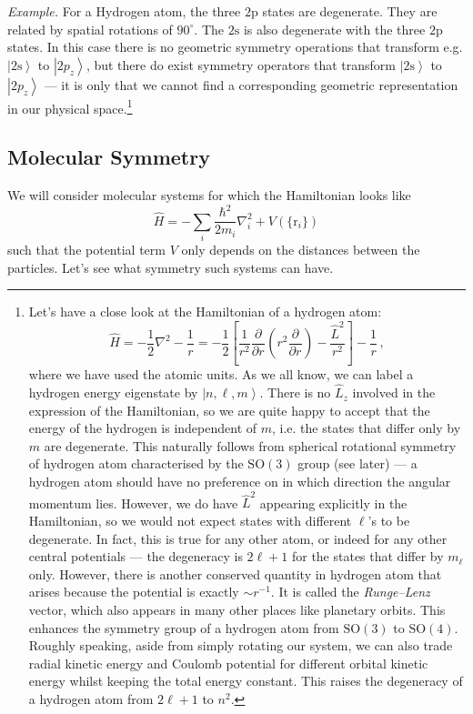 \documentclass{article}
\theoremstyle{plain}\theoremheaderfont{\normalfont\itshape}\theorembodyfont{\rmfamily}\theoremseparator{.}\newtheorem*{rem}{Remark}\newtheorem*{ex}{Example}\newtheorem*{proof}{Proof}\newtheorem*{altp}{Alternative proof}
\theoremstyle{plain}\theoremheaderfont{\normalfont\bfseries}\theorembodyfont{\rmfamily}\theoremseparator{.}\newtheorem{thm}{Theorem}[section]\newtheorem{lem}[thm]{Lemma}\newtheorem{prop}[thm]{Proposition}\newtheorem*{cor}{Corollary}\newtheorem{defn}[thm]{Definition}\newtheorem{clm}[thm]{Claim}\newtheorem{clminproof}{Claim}\newtheorem*{law}{Law}\newtheorem{pos}[thm]{Postulate}
\theoremstyle{break}\theoremheaderfont{\normalfont\itshape}\theorembodyfont{\rmfamily}\theoremseparator{.\medskip}\newtheorem*{proofskip}{Proof}\newtheorem*{exs}{Examples}\newtheorem*{rems}{Remarks}
\theoremstyle{break}\theoremheaderfont{\normalfont\bfseries}\theorembodyfont{\rmfamily}\theoremseparator{.\medskip}\newtheorem{lemskip}[thm]{Lemma}\newtheorem{defnskip}[thm]{Definition}\newtheorem{propskip}[thm]{Proposition}\newtheorem{thmskip}[thm]{Theorem}
\numberwithin{equation}{section}
\newcommand{\pdv}[3][]{\frac{\partial^{#1} #2}{{\partial #3}^{#1}}}
\newcommand{\ket}[1]{\left| #1 \right\rangle}
\newcommand{\vb}[1]{\bm{\mathrm{#1}}}
\newcommand{\laplacian}{\nabla^2}
\newcommand{\SO}{\mathrm{SO}}
\begin{document}
    \textit{Example.} For a Hydrogen atom, the three \(\mathrm{2p}\) states are degenerate. They are related by spatial rotations of \(90^\circ\). The \(\mathrm{2s}\) is also degenerate with the three \(\mathrm{2p}\) states. In this case there is no geometric symmetry operations that transform e.g. \(\ket{\mathrm{2s}}\) to \(\ket{2p_z}\), but there do exist symmetry operators that transform \(\ket{\mathrm{2s}}\) to \(\ket{2p_z}\) --- it is only that we cannot find a corresponding geometric representation in our physical space.\footnote{Let's have a close look at the Hamiltonian of a hydrogen atom:
    \begin{equation}
        \hat{H}=-\frac{1}{2}\laplacian-\frac{1}{r}=-\frac{1}{2}\left[\frac{1}{r^2}\pdv{}{r}\left(r^2\pdv{}{r}\right)-\frac{\hat{L}^2}{r^2}\right]-\frac{1}{r}\,,
    \end{equation}
    where we have used the atomic units. As we all know, we can label a hydrogen energy eigenstate by \(\ket{n,\ell,m}\). There is no \(\hat{L}_z\) involved in the expression of the Hamiltonian, so we are quite happy to accept that the energy of the hydrogen is independent of \(m\), i.e. the states that differ only by \(m\) are degenerate. This naturally follows from spherical rotational symmetry of hydrogen atom characterised by the \(\SO(3)\) group (see later) --- a hydrogen atom should have no preference on in which direction the angular momentum lies. However, we do have \(\hat{L}^2\) appearing explicitly in the Hamiltonian, so we would not expect states with different \(\ell\)'s to be degenerate. In fact, this is true for any other atom, or indeed for any other central potentials --- the degeneracy is \(2\ell+1\) for the states that differ by \(m_\ell\) only. However, there is another conserved quantity in hydrogen atom that arises because the potential is exactly \(\sim r^{-1}\). It is called the \textit{Runge--Lenz} vector, which also appears in many other places like planetary orbits. This enhances the symmetry group of a hydrogen atom from \(\SO(3)\) to \(\SO(4)\). Roughly speaking, aside from simply rotating our system, we can also trade radial kinetic energy and Coulomb potential for different orbital kinetic energy whilst keeping the total energy constant. This raises the degeneracy of a hydrogen atom from \(2\ell+1\) to \(n^2\).}

    \subsection{Molecular Symmetry}
    We will consider molecular systems for which the Hamiltonian looks like
    \begin{equation}
        \hat{H}=-\sum_{i}\frac{\hbar^2}{2m_i}\laplacian_i+V(\{\vb{r}_i\})
    \end{equation}
    such that the potential term \(V\) only depends on the distances between the particles. Let's see what symmetry such systems can have.
\end{document}
